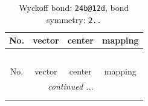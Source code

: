 \documentclass[fleqn,8pt]{jsarticle}
\begin{document}
\renewcommand{\arraystretch}{1.2}
\begin{longtable}{cccc}
\caption{Wyckoff bond: {\tt 24b@12d}, bond symmetry: {\tt 2..}}
 \\
 \hline \hline
No. & vector & center & mapping \\ \hline \endfirsthead

\multicolumn{3}{l}{\tablename\ \thetable{}} \\
 \hline \hline
No. & vector & center & mapping \\ \hline \endhead

 \hline \hline
\multicolumn{3}{r}{\footnotesize\it continued ...} \\ \endfoot

 \hline \hline
\multicolumn{3}{r}{} \\ \endlastfoot


\end{longtable}
\end{document}
